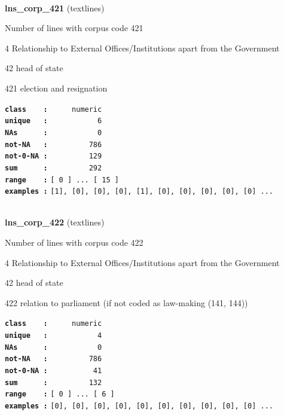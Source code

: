 \documentclass[]{article}
\begin{document}
~

\textbf{lns\_corp\_421} (textlines)

Number of lines with corpus code 421

4 Relationship to External Offices/Institutions apart from the
Government

42 head of state

421 election and resignation

\textbf{\texttt{class\ \ \ \ :}} \texttt{~~~~~numeric}\\
\textbf{\texttt{unique\ \ \ :}} \texttt{~~~~~~~~~~~6}\\
\textbf{\texttt{NAs\ \ \ \ \ \ :}} \texttt{~~~~~~~~~~~0}\\
\textbf{\texttt{not-NA\ \ \ :}} \texttt{~~~~~~~~~786}\\
\textbf{\texttt{not-0-NA\ :}} \texttt{~~~~~~~~~129}\\
\textbf{\texttt{sum\ \ \ \ \ \ :}} \texttt{~~~~~~~~~292}\\
\textbf{\texttt{range\ \ \ \ :}}
\texttt{{[}\ 0\ {]}\ ...\ {[}\ 15\ {]}}\\
\textbf{\texttt{examples\ :}}
\texttt{{[}1{]},\ {[}0{]},\ {[}0{]},\ {[}0{]},\ {[}1{]},\ {[}0{]},\ {[}0{]},\ {[}0{]},\ {[}0{]},\ {[}0{]}\ ...}\\

~

\textbf{lns\_corp\_422} (textlines)

Number of lines with corpus code 422

4 Relationship to External Offices/Institutions apart from the
Government

42 head of state

422 relation to parliament (if not coded as law-making (141, 144))

\textbf{\texttt{class\ \ \ \ :}} \texttt{~~~~~numeric}\\
\textbf{\texttt{unique\ \ \ :}} \texttt{~~~~~~~~~~~4}\\
\textbf{\texttt{NAs\ \ \ \ \ \ :}} \texttt{~~~~~~~~~~~0}\\
\textbf{\texttt{not-NA\ \ \ :}} \texttt{~~~~~~~~~786}\\
\textbf{\texttt{not-0-NA\ :}} \texttt{~~~~~~~~~~41}\\
\textbf{\texttt{sum\ \ \ \ \ \ :}} \texttt{~~~~~~~~~132}\\
\textbf{\texttt{range\ \ \ \ :}}
\texttt{{[}\ 0\ {]}\ ...\ {[}\ 6\ {]}}\\
\textbf{\texttt{examples\ :}}
\texttt{{[}0{]},\ {[}0{]},\ {[}0{]},\ {[}0{]},\ {[}0{]},\ {[}0{]},\ {[}0{]},\ {[}0{]},\ {[}0{]},\ {[}0{]}\ ...}\\
\end{document}
